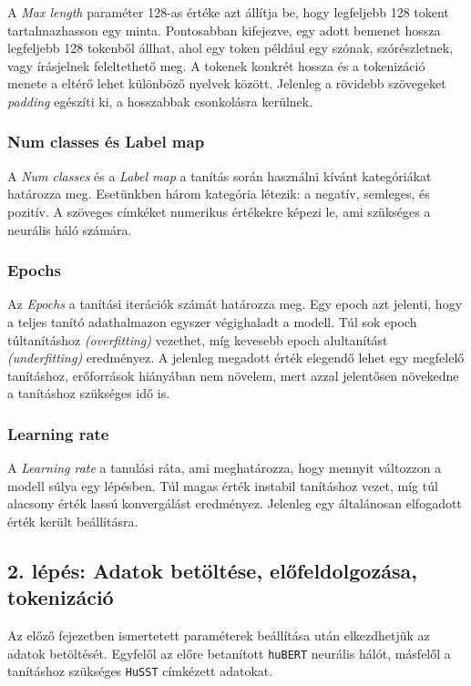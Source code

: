 \documentclass[12pt]{article}
\begin{document}
A \textit{Max length} paraméter 128-as értéke azt állítja be, hogy legfeljebb 128 tokent tartalmazhasson egy minta. Pontosabban kifejezve, egy adott bemenet hossza legfeljebb 128 tokenből állhat, ahol egy token például egy szónak, szórészletnek, vagy írásjelnek feleltethető meg. A tokenek konkrét hossza és a tokenizáció menete a eltérő lehet különböző nyelvek között. Jelenleg a rövidebb szövegeket \textit{padding} egészíti ki, a hosszabbak csonkolásra kerülnek.

\subsubsection{Num classes és Label map}

A \textit{Num classes} és a \textit{Label map} a tanítás során használni kívánt kategóriákat határozza meg. Esetünkben három kategória létezik: a negatív, semleges, és pozitív. A szöveges címkéket numerikus értékekre képezi le, ami szükséges a neurális háló számára.

\subsubsection{Epochs}

Az \textit{Epochs} a tanítási iterációk számát határozza meg. Egy epoch azt jelenti, hogy a teljes tanító adathalmazon egyszer végighaladt a modell. Túl sok epoch túltanításhoz \textit{(overfitting)} vezethet, míg kevesebb epoch alultanítást \textit{(underfitting)} eredményez. A jelenleg megadott érték elegendő lehet egy megfelelő tanításhoz, erőforrások hiányában nem növelem, mert azzal jelentősen növekedne a tanításhoz szükséges idő is.

\subsubsection{Learning rate}

A \textit{Learning rate} a tanulási ráta, ami meghatározza, hogy mennyit változzon a modell súlya egy lépésben. Túl magas érték instabil tanításhoz vezet, míg túl alacsony érték lassú konvergálást eredményez. Jelenleg egy általánosan elfogadott érték került beállításra.

\subsection{2. lépés: Adatok betöltése, előfeldolgozása, tokenizáció}

Az előző fejezetben ismertetett paraméterek beállítása után elkezdhetjük az adatok betöltését. Egyfelől az előre betanított \texttt{huBERT} neurális hálót, másfelől a tanításhoz szükséges \texttt{HuSST} címkézett adatokat.
\end{document}
